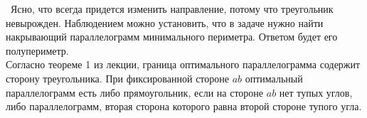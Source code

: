 \indent\indent\ Ясно, что всегда придется изменить направление,
потому что треугольник невырожден. Наблюдением можно установить,
что в задаче нужно найти накрывающий параллелограмм минимального
периметра. Ответом будет его полупериметр.\\
Согласно теореме 1 из лекции, граница оптимального параллелограмма
содержит сторону треугольника. При фиксированной стороне $ab$
оптимальный параллелограмм есть либо прямоугольник, если на стороне
$ab$ нет тупых углов, либо параллелограмм, вторая сторона которого
равна второй стороне тупого угла.

